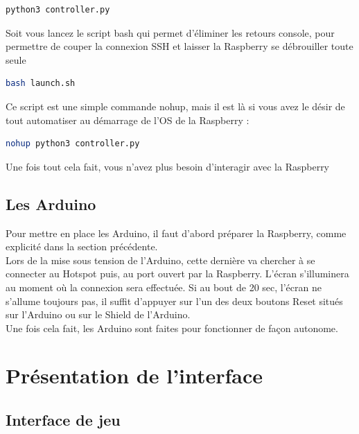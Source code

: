 \documentclass[11pt]{article}
\begin{document}
\begin{lstlisting}[language=bash]
	python3 controller.py
\end{lstlisting}

\noindent Soit vous lancez le script bash qui permet d'éliminer les retours console, pour permettre de couper la connexion SSH et laisser la Raspberry se débrouiller toute seule

\begin{lstlisting}[language=bash]
	bash launch.sh
\end{lstlisting}

\noindent Ce script est une simple commande nohup, mais il est là si vous avez le désir de tout automatiser au démarrage de l'OS de la Raspberry :

\begin{lstlisting}[language=bash]
	nohup python3 controller.py
\end{lstlisting}

\noindent Une fois tout cela fait, vous n'avez plus besoin d'interagir avec la Raspberry

\newpage
\subsection{Les Arduino}

\noindent Pour mettre en place les Arduino, il faut d'abord préparer la Raspberry, comme explicité dans la section précédente.
\\

\noindent Lors de la mise sous tension de l'Arduino, cette dernière va chercher à se connecter au Hotspot puis, au port ouvert par la Raspberry. L'écran s'illuminera au moment où la connexion sera effectuée. Si au bout de 20 sec, l'écran ne s'allume toujours pas, il suffit d'appuyer sur l'un des deux boutons Reset situés sur l'Arduino ou sur le Shield de l'Arduino.
\\

\noindent Une fois cela fait, les Arduino sont faites pour fonctionner de façon autonome.

\newpage 
\section{Présentation de l'interface}

\subsection{Interface de jeu}
\end{document}
